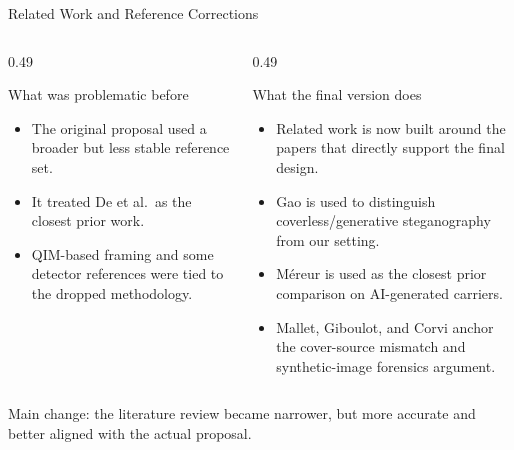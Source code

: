 \documentclass[aspectratio=169,11pt]{beamer}
\begin{document}
\begin{frame}{Related Work and Reference Corrections}
\footnotesize
\begin{columns}[T]
\begin{column}{0.49\textwidth}
\begin{block}{What was problematic before}
\begin{itemize}
\item The original proposal used a broader but less stable reference set.
\item It treated De et al.\ as the closest prior work.
\item QIM-based framing and some detector references were tied to the dropped methodology.
\end{itemize}
\end{block}
\end{column}
\begin{column}{0.49\textwidth}
\begin{exampleblock}{What the final version does}
\begin{itemize}
\item Related work is now built around the papers that directly support the final design.
\item Gao is used to distinguish coverless/generative steganography from our setting.
\item M\'{e}reur is used as the closest prior comparison on AI-generated carriers.
\item Mallet, Giboulot, and Corvi anchor the cover-source mismatch and synthetic-image forensics argument.
\end{itemize}
\end{exampleblock}
\end{column}
\end{columns}

\vspace{0.05cm}
{\footnotesize\color{umgray}Main change: the literature review became narrower, but more accurate and better aligned with the actual proposal.}
\end{frame}
\end{document}
